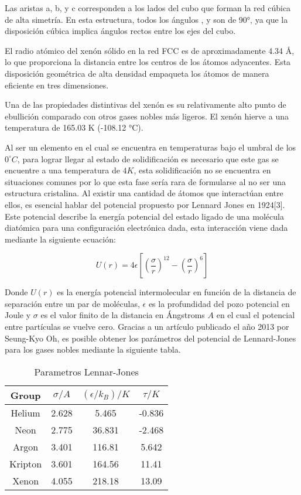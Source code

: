 \documentclass[10pt,letterpaper,twocolumn]{article}
\begin{document}
Las aristas a, b, y c corresponden a los lados del cubo que forman la red cúbica de alta simetría. En esta estructura, todos los ángulos \si{\alpha}, \si{\beta} y \si{\gamma} son de 90°, ya que la disposición cúbica implica ángulos rectos entre los ejes del cubo.

El radio atómico del xenón sólido en la red FCC es de aproximadamente 4.34 Å, lo que proporciona la distancia entre los centros de los átomos adyacentes. Esta disposición geométrica de alta densidad empaqueta los átomos de manera eficiente en tres dimensiones.

Una de las propiedades distintivas del xenón es su relativamente alto punto de ebullición comparado con otros gases nobles más ligeros. El xenón hierve a una temperatura de 165.03 K (-108.12 °C).

Al ser un elemento en el cual se encuentra en temperaturas bajo el umbral de los $0^{\circ}C$, para lograr llegar al estado de solidificación es necesario que este gas se encuentre a una temperatura de $4K$, esta solidificación no se encuentra en situaciones comunes por lo
que esta fase sería rara de formularse al no ser una estructura cristalina.
Al existir una cantidad de átomos que interactúan entre ellos, es esencial hablar del potencial propuesto por Lennard Jones en 1924[3]. Este potencial describe la energía potencial del estado ligado de una molécula diatómica para una configuración electrónica dada, esta interacción viene dada mediante la siguiente ecuación:

\begin{equation}
    U(r)=4\epsilon\left[\left(\dfrac{\sigma}{r}\right)^{12} - \left(\dfrac{\sigma}{r}\right)^{6}\right]
\end{equation} 

Donde $U(r)$ es la energía potencial intermolecular en función de la distancia de separación entre un par de moléculas, $\epsilon$ es la profundidad del pozo potencial en Joule y $\sigma$ es el valor finito de la distancia en Ángstroms $A$ en el cual el potencial entre partículas se vuelve cero.
Gracias a un artículo publicado el año 2013 por Seung-Kyo Oh, es posible
obtener los parámetros del potencial de Lennard-Jones para los gases nobles
mediante la siguiente tabla.

\begin{table}[h] %
\centering %
\begin{tabular}{cccc}
\toprule
Group & $\sigma / A $& $(\epsilon/k_{B})/K$ & $\tau/K$ \\
\midrule 
Helium  & 2.628 & 5.465 & -0.836 \\
Neon  & 2.775 & 36.831 & -2.468\\ 
Argon  & 3.401 & 116.81 & 5.642\\
Kripton  & 3.601 & 164.56 & 11.41\\
Xenon & 4.055 & 218.18 & 13.09\\

\bottomrule
\end{tabular}
\caption{Parametros Lennar-Jones}
\label{tab:periodos_oscilacion}
\end{table}
\end{document}
